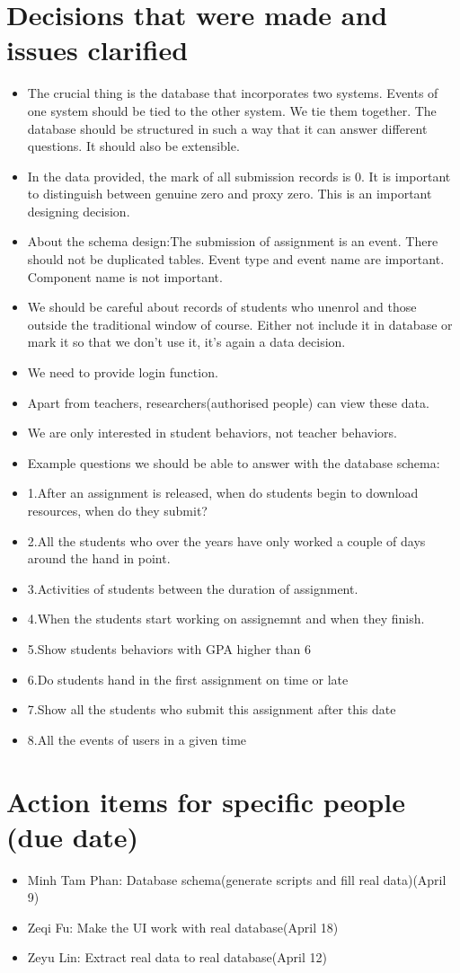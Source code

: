 \documentclass[11pt, a4paper]{article}
\begin{document}
\section{Decisions that were made and issues clarified}
\begin{itemize}
	\item The crucial thing is the database that incorporates two systems. Events of one system should be tied to the other system. We tie them together. The database should be structured in such a way that it can answer different questions. It should also be extensible.
	\item In the data provided, the mark of all submission records is 0. It is important to distinguish between genuine zero and proxy zero. This is an important designing decision.
	\item About the schema design:The submission of assignment is an event. There should not be duplicated tables. Event type and event name are important. Component name is not important.
	\item We should be careful about records of students who unenrol and those outside the traditional window of course. Either not include it in database or mark it so that we don't use it, it's again a data decision.
	\item We need to provide login function.
	\item Apart from teachers, researchers(authorised people) can view these data.
	\item We are only interested in student behaviors, not teacher behaviors.
	\item Example questions we should be able to answer with the database schema:
	\item 1.After an assignment is released, when do students begin to download resources, when do they submit? 
	\item 2.All the students who over the  years have only worked a couple of days around the hand in point. 
	\item 3.Activities of students between the duration of assignment. 
	\item 4.When the students start working on assignemnt and when they finish. 
	\item 5.Show students behaviors with GPA higher than 6 
	\item 6.Do students hand in the first assignment on time or late
	\item 7.Show all the students who submit this assignment after this date
	\item 8.All the events of users in a given time
\end{itemize}

\section{Action items for specific people (due date)}
\begin{itemize}
	\item Minh Tam Phan: Database schema(generate scripts and fill real data)(April 9)
	\item Zeqi Fu: Make the UI work with real database(April 18)
	\item Zeyu Lin: Extract real data to real database(April 12)

\end{itemize}
\end{document}

